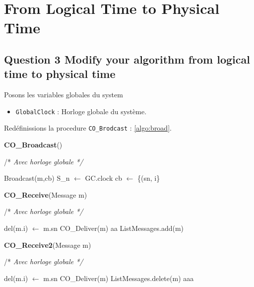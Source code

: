 \chapter{From Logical Time to Physical Time}

\section{Question 3 Modify your algorithm from logical time to physical time}

Posons les variables globales du system

\begin{itemize}
\item  \verb+GlobalClock+ : Horloge globale du système.
\end{itemize}


Redéfinissions la procedure \verb+CO_Brodcast+ : \ref{algo:broad}.

\begin{algorithm}
\caption{\textbf{CO\_Broadcast}()}
/* \textit{ Avec horloge globale */}
\label{algo:broad}
\begin{algorithmic}[1]
\STATE Broadcast(m,cb)
\STATE S\_n $\leftarrow$ GC.clock
\STATE cb $\leftarrow $ \{(sn, i\}
\end{algorithmic}
\end{algorithm}



\begin{algorithm}
\caption{\textbf{CO\_Receive}(Message m)}
/* \textit{ Avec horloge globale */}
\label{algo:q3}
\begin{algorithmic}[1]
   \STATE  del(m.i) $\leftarrow$ m.sn
   \STATE  CO\_Deliver(m)
\STATE aa%
   \ENDFOR
   \ELSE
   \STATE ListMessages.add(m)
  \ENDIF  
\end{algorithmic}
\end{algorithm}


\begin{algorithm}
\caption{\textbf{CO\_Receive2}(Message m)}
/* \textit{ Avec horloge globale */}
\label{algo:receive2}
\begin{algorithmic}[1]
   \STATE  del(m.i) $\leftarrow$ m.sn
   \STATE  CO\_Deliver(m)
   \STATE ListMessages.delete(m)
   \STATE aaa%
   \ENDFOR
  \ENDIF  
\end{algorithmic}
\end{algorithm}
